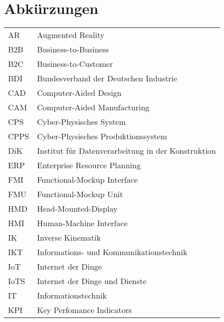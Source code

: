 \chapter*{Abkürzungen}\label{cha:Abkürzungen}
\begin{tabular}{l l} 
		AR 		& 	Augmented Reality  \\
		B2B 	& 	Business-to-Business \\
		B2C		&	Business-to-Customer \\
		BDI		&	Bundesverband der Deutschen Industrie \\
		CAD		&	Computer-Aided Design \\
		CAM		&	Computer-Aided Manufacturing \\
		CPS		&  	Cyber-Physisches System \\
		CPPS 	& 	Cyber-Physisches Produktionssystem \\
		DiK 	& 	Institut für Datenverarbeitung in der Konstruktion \\
		ERP 	& 	Enterprise Resource Planning  \\
		FMI 	& 	Functional-Mockup Interface \\
		FMU 	& 	Functional-Mockup Unit \\
		HMD		&	Head-Mounted-Display \\
		HMI		&	Human-Machine Interface \\
		IK		&	Inverse Kinematik \\
		IKT		& 	Informations- und Kommunikationstechnik \\
		IoT		&	Internet der Dinge \\
		IoTS 	& 	Internet der Dinge und Dienste \\
		IT		&	Informationstechnik \\
		KPI 	& 	Key Perfomance Indicators \\

\end{tabular}
